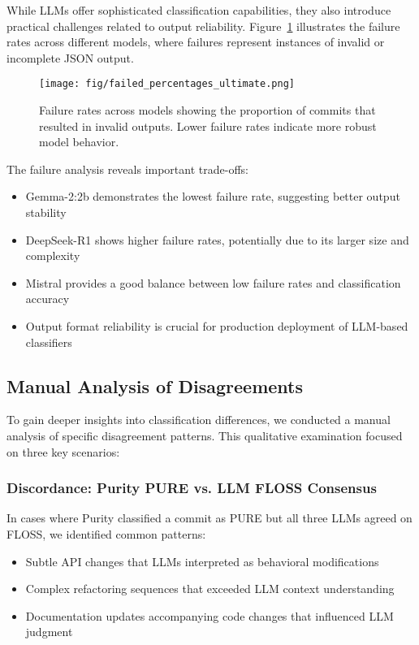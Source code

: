 While LLMs offer sophisticated classification capabilities, they also introduce practical challenges related to output reliability. Figure~\ref{fig:failed-percentages} illustrates the failure rates across different models, where failures represent instances of invalid or incomplete JSON output.

\begin{figure}[H]
\centering
\texttt{[image: fig/failed\_percentages\_ultimate.png]}
\caption{Failure rates across models showing the proportion of commits that resulted in invalid outputs. Lower failure rates indicate more robust model behavior.}
\label{fig:failed-percentages}
\end{figure}

The failure analysis reveals important trade-offs:
\begin{itemize}
    \item Gemma-2:2b demonstrates the lowest failure rate, suggesting better output stability
    \item DeepSeek-R1 shows higher failure rates, potentially due to its larger size and complexity
    \item Mistral provides a good balance between low failure rates and classification accuracy
    \item Output format reliability is crucial for production deployment of LLM-based classifiers
\end{itemize}

\subsection{Manual Analysis of Disagreements}

To gain deeper insights into classification differences, we conducted a manual analysis of specific disagreement patterns. This qualitative examination focused on three key scenarios:

\subsubsection{Discordance: Purity PURE vs. LLM FLOSS Consensus}

In cases where Purity classified a commit as PURE but all three LLMs agreed on FLOSS, we identified common patterns:
\begin{itemize}
    \item Subtle API changes that LLMs interpreted as behavioral modifications
    \item Complex refactoring sequences that exceeded LLM context understanding
    \item Documentation updates accompanying code changes that influenced LLM judgment
\end{itemize}

